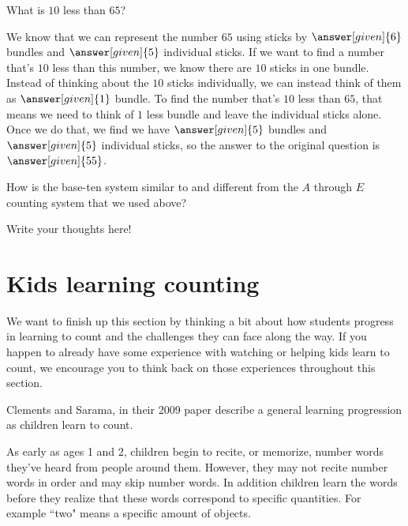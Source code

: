 \documentclass{ximera}
\begin{document}
\begin{example}

What is $10$ less than $65$?

\begin{explanation}
We know that we can represent the number $65$ using sticks by $\answer[given]{6}$ bundles and $\answer[given]{5}$ individual sticks. If we want to find a number that's $10$ less than this number, we know there are $10$ sticks in one bundle. Instead of thinking about the $10$ sticks individually, we can instead think of them as $\answer[given]{1}$ bundle. To find the number that's $10$ less than $65$, that means we need to think of $1$ less bundle and leave the individual sticks alone. Once we do that, we find we have $\answer[given]{5}$ bundles and $\answer[given]{5}$ individual sticks, so the answer to the original question is $\answer[given]{55}$.
\end{explanation}

\end{example}

\begin{question}
How is the base-ten system similar to and different from the $A$ through $E$ counting system that we used above?

\begin{freeResponse}
Write your thoughts here!
\end{freeResponse}
\end{question}

\section{Kids learning counting}

We want to finish up this section by thinking a bit about how students progress in learning to count and the challenges they can face along the way. If you happen to already have some experience with watching or helping kids learn to count, we encourage you to think back on those experiences throughout this section.

Clements and Sarama, in their 2009 paper  describe a general learning progression as children learn to count. 

As early as ages 1 and 2, children begin to recite, or memorize, number words they've heard from people around them. However, they may not recite number words in order and may skip number words. In addition children  learn the words before they realize that these words correspond to specific quantities. For example ``two" means a specific amount of objects. 
\end{document}
